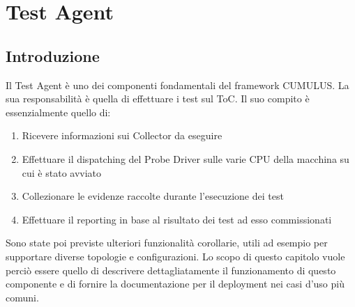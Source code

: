\chapter{Test Agent}
\section*{Introduzione}
Il Test Agent è uno dei componenti fondamentali del framework CUMULUS. La sua responsabilità è quella di effettuare i test sul ToC.
Il suo compito è essenzialmente quello di:
\begin{enumerate}[nolistsep]
\item Ricevere informazioni sui Collector da eseguire
\item Effettuare il dispatching del Probe Driver sulle varie CPU della macchina su cui è stato avviato
\item Collezionare le evidenze raccolte durante l'esecuzione dei test
\item Effettuare il reporting in base al risultato dei test ad esso commissionati
\end{enumerate}
Sono state poi previste ulteriori funzionalità corollarie, utili ad esempio per supportare diverse topologie e configurazioni.
Lo scopo di questo capitolo vuole perciò essere quello di descrivere dettagliatamente il funzionamento di questo componente e di fornire la documentazione per il deployment nei casi d'uso più comuni.

